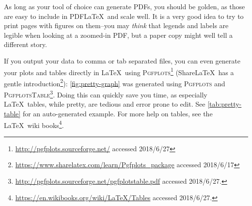 As long as your tool of choice can generate PDFs, you should be golden, as
those are easy to include in PDF\LaTeX\ and scale well. It is a very good
idea to try to print pages with figures on them--you may \emph{think} that
legends and labels are legible when looking at a zoomed-in PDF, but a paper
copy might well tell a different story.

If you output your data to comma or tab separated files, you can even
generate your plots and tables directly in \LaTeX\ using
\textsc{Pgfplots}\footnote{\url{http://pgfplots.sourceforge.net/} accessed
  2018/6/27} (Share\LaTeX\ has a gentle
introduction\footnote{\url{https://www.sharelatex.com/learn/Pgfplots_package}
  accessed 2018/6/17}): \autoref{fig:pretty-graph} was generated using
\textsc{Pgfplots} and
\textsc{PgfplotsTable}\footnote{\url{http://pgfplots.sourceforge.net/pgfplotstable.pdf}
  accessed 2018/6/27.}.  Doing this can quickly save you time, as especially
\LaTeX\ tables, while pretty, are tedious and error prone to edit. See
\autoref{tab:pretty-table} for an auto-generated example. For more help on
tables, see the \LaTeX\ wiki
books\footnote{\url{https://en.wikibooks.org/wiki/LaTeX/Tables} accessed
  2018/6/27.}.


